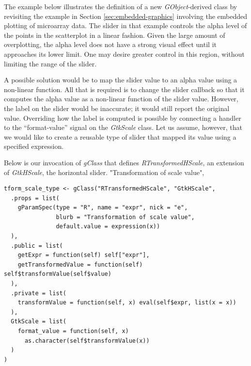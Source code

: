 \documentclass[article]{jss}
\begin{document}
The example below illustrates the definition of a new
\emph{GObject}-derived
class by revisiting the example in Section \ref{sec:embedded-graphics} involving the embedded plotting of 
microarray data.
The slider in that example controls the alpha level of the
points in the scatterplot in a linear fashion. Given the large amount
of
overplotting, the alpha level does not have a strong visual effect
until it
approaches its lower limit. One may desire greater control in this
region,
without limiting the range of the slider. 

A possible solution would be to map the slider value to an alpha value
using a non-linear function. All that is required is to change the
slider callback so that it computes the alpha value as a non-linear
function of the slider value. However, the label on the slider would
be inaccurate; it would still report the original value.  Overriding
how the label is computed is possible by connecting a handler
to the
``format-value'' signal on the \emph{GtkScale} class. Let us assume,
however, that we would like to create a reusable type of slider that
mapped its value using a specified  expression.

Below is our invocation of \emph{gClass} that
defines \emph{RTransformedHScale}, an extension of \emph{GtkHScale},
the horizontal slider.
"Transformation of scale value",
% 
%

\begin{verbatim}
tform_scale_type <- gClass("RTransformedHScale", "GtkHScale",
  .props = list(
    gParamSpec(type = "R", name = "expr", nick = "e", 
               blurb = "Transformation of scale value",                 
               default.value = expression(x))
  ),
  .public = list(
    getExpr = function(self) self["expr"],
    getTransformedValue = function(self)
self$transformValue(self$value)
  ),
  .private = list(
    transformValue = function(self, x) eval(self$expr, list(x = x))
  ),
  GtkScale = list(
    format_value = function(self, x)
      as.character(self$transformValue(x))
  )
)
\end{verbatim}
\end{document}
